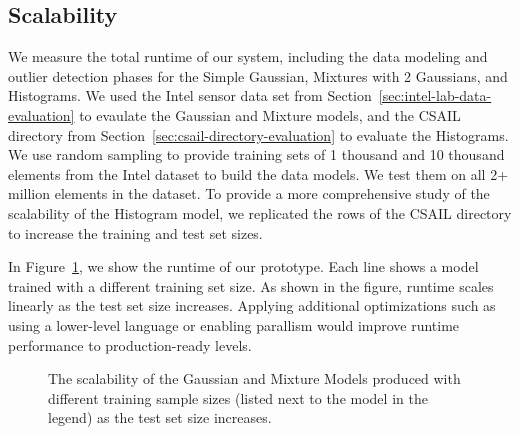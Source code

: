 \subsection{Scalability}
\label{sec:performance-evaluation}

We measure the total runtime of our system, including the data modeling and outlier detection phases for the Simple Gaussian, Mixtures with 2 Gaussians, and Histograms. 
We used the Intel sensor data set from Section~\ref{sec:intel-lab-data-evaluation} to evaulate the Gaussian and Mixture models, and the CSAIL directory from Section~\ref{sec:csail-directory-evaluation} to evaluate the Histograms. 
We use random sampling to provide training sets of 1 thousand and 10 thousand elements from the Intel dataset to build the data models.
We test them on all 2+ million elements in the dataset.
To provide a more comprehensive study of the scalability of the Histogram model, we replicated the rows of the CSAIL directory to increase the training and test set sizes. 

In Figure~\ref{fig:scaling}, we show the runtime of our prototype. Each line shows a model trained with a different training set size. As shown in the figure, runtime scales linearly as the test set size increases.
Applying additional optimizations such as using a lower-level language or enabling parallism would improve runtime performance to production-ready levels. 

\begin{figure}
\centering
\caption{The scalability of the Gaussian and Mixture Models produced with different training sample sizes (listed next to the model in the legend) as the test set size increases.}
\label{fig:scaling}
\end{figure}
